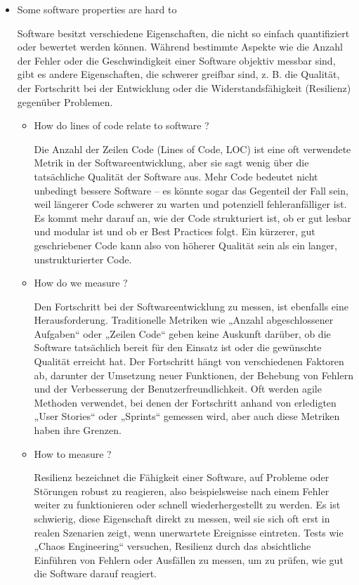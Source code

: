 \begin{itemize}
     \item Some software properties are hard to 
     \begin{infoBox}
         Software besitzt verschiedene Eigenschaften, die nicht so einfach quantifiziert oder bewertet werden können. Während bestimmte Aspekte wie die Anzahl der Fehler oder die Geschwindigkeit einer Software objektiv messbar sind, gibt es andere Eigenschaften, die schwerer greifbar sind, z. B. die Qualität, der Fortschritt bei der Entwicklung oder die Widerstandsfähigkeit (Resilienz) gegenüber Problemen.
     \end{infoBox}
     \begin{itemize}
         \item How do lines of code relate to software ?
         \begin{infoBox}
             Die Anzahl der Zeilen Code (Lines of Code, LOC) ist eine oft verwendete Metrik in der Softwareentwicklung, aber sie sagt wenig über die tatsächliche Qualität der Software aus. Mehr Code bedeutet nicht unbedingt bessere Software – es könnte sogar das Gegenteil der Fall sein, weil längerer Code schwerer zu warten und potenziell fehleranfälliger ist. Es kommt mehr darauf an, wie der Code strukturiert ist, ob er gut lesbar und modular ist und ob er Best Practices folgt. Ein kürzerer, gut geschriebener Code kann also von höherer Qualität sein als ein langer, unstrukturierter Code.
         \end{infoBox}
         \item How do we measure ?
         \begin{infoBox}
             Den Fortschritt bei der Softwareentwicklung zu messen, ist ebenfalls eine Herausforderung. Traditionelle Metriken wie „Anzahl abgeschlossener Aufgaben“ oder „Zeilen Code“ geben keine Auskunft darüber, ob die Software tatsächlich bereit für den Einsatz ist oder die gewünschte Qualität erreicht hat. Der Fortschritt hängt von verschiedenen Faktoren ab, darunter der Umsetzung neuer Funktionen, der Behebung von Fehlern und der Verbesserung der Benutzerfreundlichkeit. Oft werden agile Methoden verwendet, bei denen der Fortschritt anhand von erledigten „User Stories“ oder „Sprints“ gemessen wird, aber auch diese Metriken haben ihre Grenzen.
         \end{infoBox}
         \item How to measure ?
         \begin{infoBox}
             Resilienz bezeichnet die Fähigkeit einer Software, auf Probleme oder Störungen robust zu reagieren, also beispielsweise nach einem Fehler weiter zu funktionieren oder schnell wiederhergestellt zu werden. Es ist schwierig, diese Eigenschaft direkt zu messen, weil sie sich oft erst in realen Szenarien zeigt, wenn unerwartete Ereignisse eintreten. Tests wie „Chaos Engineering“ versuchen, Resilienz durch das absichtliche Einführen von Fehlern oder Ausfällen zu messen, um zu prüfen, wie gut die Software darauf reagiert.
         \end{infoBox}
     \end{itemize}
\end{itemize}
